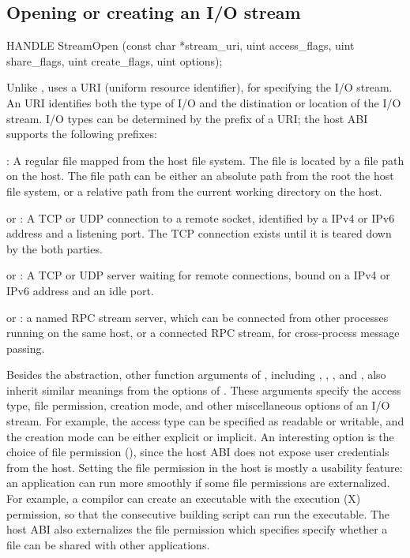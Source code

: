 \subsection*{Opening or creating an I/O stream}




\begin{paldef}
HANDLE StreamOpen (const char *stream_uri,
                   uint access_flags, uint share_flags,
                   uint create_flags, uint options);
\end{paldef}



Unlike ,  uses a URI (uniform resource identifier), for specifying the I/O stream.
An URI identifies both the type of I/O and the distination or location of the I/O stream.
I/O types can be determined by the prefix of a URI;
the host ABI supports the following prefixes:


\begin{compactitem}
\item {}: A regular file mapped from the host file system. The file is located by a file path on the host. The file path can be either an absolute path from the root the host file system, or a relative path from the current working directory on the host.
\item {} or : A TCP or UDP connection to a remote socket, identified by a IPv4 or IPv6 address and a listening port. The TCP connection exists until it is teared down by the both parties.
\item {} or : A TCP or UDP server waiting for remote connections, bound on a IPv4 or IPv6 address and an idle port.
\item {} or : a named RPC stream server, which can be connected from other processes running on the same host, 
or a connected RPC stream,
for cross-process message passing.
\end{compactitem}



Besides the abstraction,
other function arguments of , including , , , and ,
also inherit similar meanings from the options of .
These arguments specify the access type, file permission, creation mode, and other miscellaneous options of an I/O stream.
For example, the access type can be specified as readable or writable,
and the creation mode can be either explicit or implicit.
An interesting option is the choice of file permission (), since the host ABI does not expose user credentials
from the host.
Setting the file permission in the host
is mostly a usability feature: 
an application can run more smoothly if some file permissions are externalized.
For example, a compilor can create an executable with the execution (X) permission, so that the consecutive building script can run the executable.
The host ABI also externalizes the file permission
which specifies specify whether a file can be shared with other applications.


